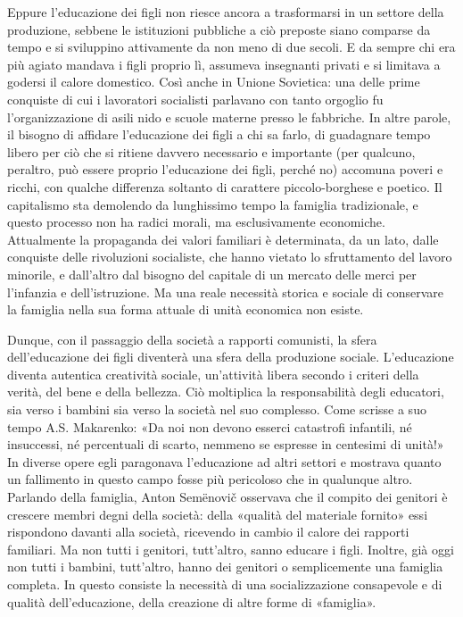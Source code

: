 \documentclass[12pt,a4paper,openany]{book}
\begin{document}
Eppure l'educazione dei figli non riesce ancora a trasformarsi in un settore della produzione, sebbene le istituzioni pubbliche a ciò preposte siano comparse da tempo e si sviluppino attivamente da non meno di due secoli. E da sempre chi era più agiato mandava i figli proprio lì, assumeva insegnanti privati e si limitava a godersi il calore domestico. Così anche in Unione Sovietica: una delle prime conquiste di cui i lavoratori socialisti parlavano con tanto orgoglio fu l'organizzazione di asili nido e scuole materne presso le fabbriche. In altre parole, il bisogno di affidare l'educazione dei figli a chi sa farlo, di guadagnare tempo libero per ciò che si ritiene davvero necessario e importante (per qualcuno, peraltro, può essere proprio l'educazione dei figli, perché no) accomuna poveri e ricchi, con qualche differenza soltanto di carattere piccolo-borghese e poetico. Il capitalismo sta demolendo da lunghissimo tempo la famiglia tradizionale, e questo processo non ha radici morali, ma esclusivamente economiche. Attualmente la propaganda dei valori familiari è determinata, da un lato, dalle conquiste delle rivoluzioni socialiste, che hanno vietato lo sfruttamento del lavoro minorile, e dall'altro dal bisogno del capitale di un mercato delle merci per l'infanzia e dell'istruzione. Ma una reale necessità storica e sociale di conservare la famiglia nella sua forma attuale di unità economica non esiste.

Dunque, con il passaggio della società a rapporti comunisti, la sfera dell'educazione dei figli diventerà una sfera della produzione sociale. L'educazione diventa autentica creatività sociale, un'attività libera secondo i criteri della verità, del bene e della bellezza. Ciò moltiplica la responsabilità degli educatori, sia verso i bambini sia verso la società nel suo complesso. Come scrisse a suo tempo A.S. Makarenko: «Da noi non devono esserci catastrofi infantili, né insuccessi, né percentuali di scarto, nemmeno se espresse in centesimi di unità!» In diverse opere egli paragonava l'educazione ad altri settori e mostrava quanto un fallimento in questo campo fosse più pericoloso che in qualunque altro. Parlando della famiglia, Anton Semënovič osservava che il compito dei genitori è crescere membri degni della società: della «qualità del materiale fornito» essi rispondono davanti alla società, ricevendo in cambio il calore dei rapporti familiari. Ma non tutti i genitori, tutt'altro, sanno educare i figli. Inoltre, già oggi non tutti i bambini, tutt'altro, hanno dei genitori o semplicemente una famiglia completa. In questo consiste la necessità di una socializzazione consapevole e di qualità dell'educazione, della creazione di altre forme di «famiglia».
\end{document}

